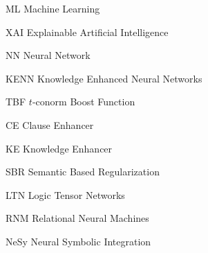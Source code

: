 \begin{abbreviations}
\item[ML] Machine Learning
\item[XAI] Explainable Artificial Intelligence
\item[NN] Neural Network
\item[KENN] Knowledge Enhanced Neural Networks
\item[TBF] $t$-conorm Boost Function
\item[CE] Clause Enhancer
\item[KE] Knowledge Enhancer
\item[SBR] Semantic Based Regularization
\item[LTN] Logic Tensor Networks
\item[RNM] Relational Neural Machines
\item[NeSy] Neural Symbolic Integration
\end{abbreviations}


